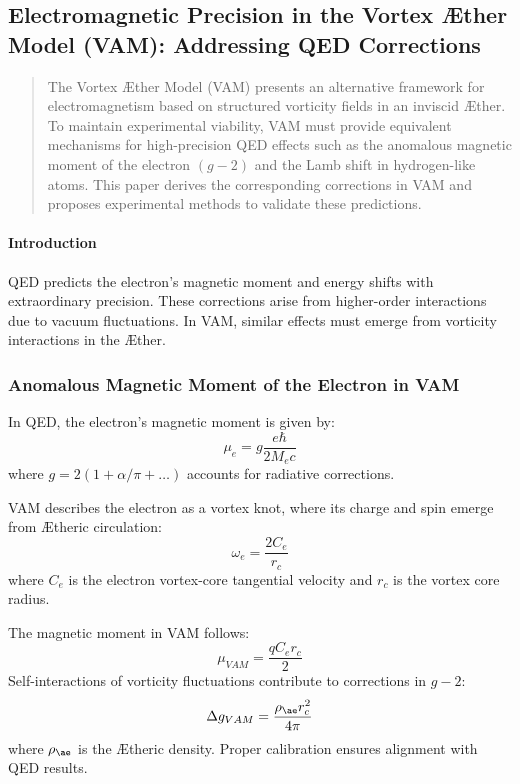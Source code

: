 

\subsection{Electromagnetic Precision in the Vortex Æther Model (VAM): Addressing QED Corrections}\label{subsec:electromagnetic-precision-in-the-vortex-ae-ther-model-(vam):-addressing-qed-corrections}


\begin{abstract}
    The Vortex Æther Model (VAM) presents an alternative framework for electromagnetism based on structured vorticity fields in an inviscid Æther. To maintain experimental viability, VAM must provide equivalent mechanisms for high-precision QED effects such as the anomalous magnetic moment of the electron $(g-2)$ and the Lamb shift in hydrogen-like atoms. This paper derives the corresponding corrections in VAM and proposes experimental methods to validate these predictions.
\end{abstract}

\paragraph*{Introduction}
QED predicts the electron's magnetic moment and energy shifts with extraordinary precision. These corrections arise from higher-order interactions due to vacuum fluctuations. In VAM, similar effects must emerge from vorticity interactions in the Æther.

\subsubsection*{Anomalous Magnetic Moment of the Electron in VAM}
In QED, the electron's magnetic moment is given by:
\begin{equation*}
    \mu_e = g \frac{e\hbar}{2M_e c}
\end{equation*}
where $g = 2(1 + \alpha / \pi + \dots)$ accounts for radiative corrections.

VAM describes the electron as a vortex knot, where its charge and spin emerge from Ætheric circulation:
\begin{equation*}
    \omega_e = \frac{2 C_e}{r_c}
\end{equation*}
where $C_e$ is the electron vortex-core tangential velocity and $r_c$ is the vortex core radius.

The magnetic moment in VAM follows:
\begin{equation*}
    \mu_{VAM} = \frac{q C_e r_c}{2}
\end{equation*}
Self-interactions of vorticity fluctuations contribute to corrections in $g-2$:
\begin{equation*}
    \Delta g_{VAM} = \frac{\rho_{\ae} r_c^2}{4\pi}
\end{equation*}
where $\rho_{\ae}$ is the Ætheric density. Proper calibration ensures alignment with QED results.

